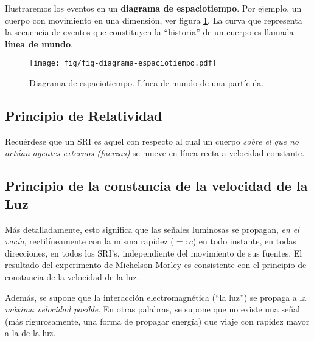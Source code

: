 Ilustraremos los eventos en un \textbf{diagrama de espaciotiempo}. Por ejemplo, un cuerpo con movimiento en una dimensión, ver figura \ref{TER1}. La curva que representa la secuencia de eventos que constituyen la ``historia'' de un cuerpo es llamada \textbf{línea de mundo}.

\begin{figure}[!h]
\centerline{\texttt{[image: fig/fig-diagrama-espaciotiempo.pdf]}}
\caption{Diagrama de espaciotiempo. Línea de mundo de una partícula.}
\label{TER1}
\end{figure}

\subsection{Principio de Relatividad}
\begin{quotation}
\end{quotation}

Recuérdese que un SRI es aquel con respecto al cual un cuerpo \textit{sobre el que no actúan agentes externos (fuerzas)} se mueve en línea recta a velocidad
constante.


\subsection{Principio de la constancia de la velocidad de la Luz}
 \begin{quotation}
\end{quotation}
Más detalladamente, esto significa que las señales luminosas se propagan, \textit{en el vacío}, rectilíneamente con la misma rapidez ($=:c$) en todo instante, en todas direcciones, en todos los SRI's, independiente del movimiento de sus fuentes. El resultado del experimento de Michelson-Morley es consistente con el principio de constancia de la velocidad de la luz.

Además, se supone que la interacción electromagnética (``la luz'') se propaga a la \textit{máxima velocidad posible}. En otras palabras, se supone que no existe una señal (más rigurosamente, una forma de propagar energía) que viaje con rapidez mayor a la de la luz.

